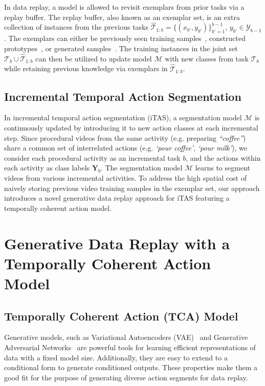 In data replay, a model is allowed to revisit exemplars from prior tasks via a replay buffer. The replay buffer, also known as an exemplar set, is an extra collection of instances from the previous tasks $\hat{\mathcal{T}}_{1:b} = \{(x_{b'}, y_{b'})\}_{b'=1}^{b-1},\, y_{b'} \in \mathcal{Y}_{b-1}$. The exemplars can either be previously seen training samples~\cite{rebuffi2017icarl}, constructed prototypes~\cite{iscen2020memory}, or generated samples~\cite{shin2017continual,xiang2019incremental}. The training instances in the joint set $\mathcal{T}_b \cup \hat{\mathcal{T}}_{1:b}$ can then be utilized to update model $\mathcal{M}$ with new classes from task $\mathcal{T}_b$ while retaining previous knowledge via exemplars in $\hat{\mathcal{T}}_{1:b}$. 

\subsection{Incremental Temporal Action Segmentation}

In incremental temporal action segmentation (iTAS), a segmentation model $\mathcal{M}$ is continuously updated by introducing it to new action classes at each incremental step. Since procedural videos from the same activity (e.g. preparing \emph{``coffee''}) share a common set of interrelated actions (e.g. \emph{`pour coffee'}, \emph{`pour milk'}), we consider each procedural activity as an incremental task $b$, and the actions within each activity as class labels $\mathbf{Y}_b$. The segmentation model $\mathcal{M}$ learns to segment videos from various incremental activities. To address the high spatial cost of naively storing previous video training samples in the exemplar set, our approach introduces a novel generative data replay approach for iTAS featuring a temporally coherent action model.

\section{Generative Data Replay with a Temporally Coherent Action Model}

\subsection{Temporally Coherent Action (TCA) Model}

Generative models, such as Variational Autoencoders (VAE)~\cite{kingma2013auto} and Generative Adversarial Networks~\cite{goodfellow2014generative} are powerful tools for learning efficient representations of data with a fixed model size. Additionally, they are easy to extend to a conditional form to generate conditioned outputs. These properties make them a good fit for the purpose of generating diverse action segments for data replay. 

